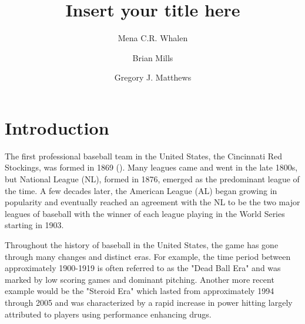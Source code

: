 \documentclass[USenglish]{article}
\theoremstyle{dgthm}
\theoremstyle{dgdef}
\begin{document}


	
  \aop

\title{Insert your title here}

\author*[1]{Mena C.R. Whalen}
\author[2]{Brian Mills}
\author[3]{Gregory J. Matthews} 
	
	
	
\abstract{}


\maketitle
	
	
\section{Introduction} 

The first professional baseball team in the United States, the Cincinnati Red Stockings, was formed in 1869 (\cite{BBHOF1869}).   Many leagues came and went in the late 1800s, but National League (NL), formed in 1876, emerged as the predominant league of the time.  A few decades later, the American League (AL) began growing in popularity and eventually reached an agreement with the NL to be the two major leagues of baseball with the winner of each league playing in the World Series starting in 1903.  

Throughout the history of baseball in the United States, the game has gone through many changes and distinct eras.  For example, the time period between approximately 1900-1919 is often referred to as the "Dead Ball Era" and was marked by low scoring games and dominant pitching.  Another more recent example would be the "Steroid Era" which lasted from approximately 1994 through 2005 and was characterized by a rapid increase in power hitting largely attributed to players using performance enhancing drugs. 
\end{document}
